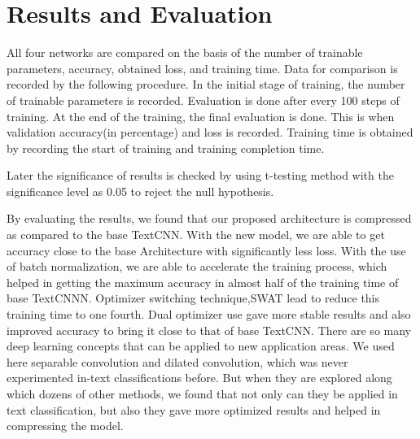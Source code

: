 \documentclass[conference]{IEEEtran}
\begin{document}
\section{Results and Evaluation}
All four networks are compared on the basis of the number of trainable parameters, accuracy, obtained loss, and training time. 
Data for comparison is recorded by the following procedure. In the initial stage of training, the number of trainable parameters is recorded. Evaluation is done after every 100 steps of training. At the end of the training, the final evaluation is done. This is when validation accuracy(in percentage) and loss is recorded. Training time is obtained by recording the start of training and training completion time.

Later the significance of results is checked by using t-testing method with the significance level as 0.05 to reject the null hypothesis.

By evaluating the results, we found that our proposed architecture is compressed as compared to the base TextCNN. With the new model, we are able to get accuracy close to the base Architecture with significantly less loss. With the use of batch normalization, we are able to accelerate the training process, which helped in getting the maximum accuracy in almost half of the training time of base TextCNNN.
Optimizer switching technique,SWAT lead to reduce this training time to one fourth. Dual optimizer use gave more stable results and also improved accuracy to bring it close to that of base TextCNN.
There are so many deep learning concepts that can be applied to new application areas. We used here separable convolution and dilated convolution, which was never experimented in-text classifications before. But when they are explored along which dozens of other methods, we found that not only can they be applied in text classification, but also they gave more optimized results and helped in compressing the model.
\end{document}

